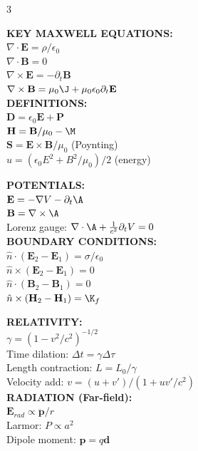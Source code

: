 \documentclass[7pt,a4paper]{article}
\newcommand{\E}{\mathbf{E}}
\newcommand{\B}{\mathbf{B}}
\newcommand{\D}{\mathbf{D}}
\renewcommand{\H}{\mathbf{H}}
\begin{document}
\begin{multicols*}{3}

\textbf{KEY MAXWELL EQUATIONS:}\\
$\nabla \cdot \E = \rho/\epsilon_0$\\
$\nabla \cdot \B = 0$\\
$\nabla \times \E = -\partial_t \B$\\
$\nabla \times \B = \mu_0 \J + \mu_0\epsilon_0 \partial_t \E$\\

\textbf{DEFINITIONS:}\\
$\D = \epsilon_0 \E + \mathbf{P}$\\
$\H = \B/\mu_0 - \M$\\
$\mathbf{S} = \E \times \B / \mu_0$ (Poynting)\\
$u = (\epsilon_0 E^2 + B^2/\mu_0)/2$ (energy)\\

\columnbreak

\textbf{POTENTIALS:}\\
$\E = -\nabla V - \partial_t \A$\\
$\B = \nabla \times \A$\\
Lorenz gauge: $\nabla \cdot \A + \frac{1}{c^2}\partial_t V = 0$\\

\textbf{BOUNDARY CONDITIONS:}\\
$\hat{n} \cdot (\E_2 - \E_1) = \sigma/\epsilon_0$\\
$\hat{n} \times (\E_2 - \E_1) = 0$\\
$\hat{n} \cdot (\B_2 - \B_1) = 0$\\
$\hat{n} \times (\H_2 - \H_1) = \K_f$\\

\columnbreak

\textbf{RELATIVITY:}\\
$\gamma = (1-v^2/c^2)^{-1/2}$\\
Time dilation: $\Delta t = \gamma \Delta \tau$\\
Length contraction: $L = L_0/\gamma$\\
Velocity add: $v = (u+v')/(1+uv'/c^2)$\\

\textbf{RADIATION (Far-field):}\\
$\E_{rad} \propto \ddot{\mathbf{p}}/r$\\
Larmor: $P \propto a^2$\\
Dipole moment: $\mathbf{p} = q\mathbf{d}$\\

\end{multicols*}
\end{document}
